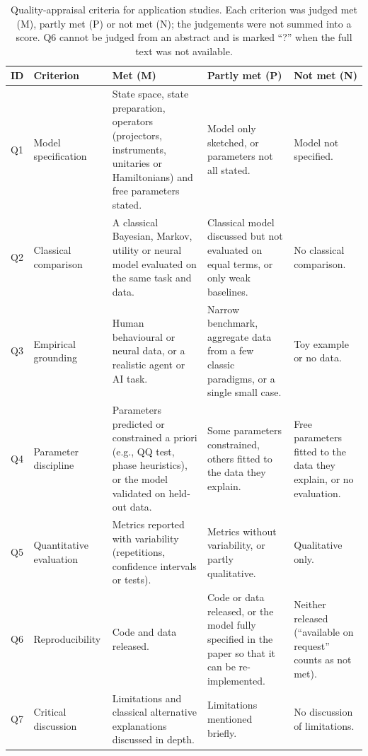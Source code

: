 \documentclass[10pt,a4paper]{article}
\begin{document}
\begin{longtable}{@{}P{0.7cm}P{2.6cm}P{4.6cm}P{4.4cm}P{4.0cm}@{}}
\caption{Quality-appraisal criteria for application studies. Each criterion was judged met (M), partly met (P) or not met (N); the judgements were not summed into a score. Q6 cannot be judged from an abstract and is marked ``?'' when the full text was not available.}\label{tab:S4}\\
\toprule \textbf{ID} & \textbf{Criterion} & \textbf{Met (M)} & \textbf{Partly met (P)} & \textbf{Not met (N)} \\ \midrule \endfirsthead
\bottomrule \endfoot

Q1 & Model specification & State space, state preparation, operators (projectors, instruments, unitaries or Hamiltonians) and free parameters stated. & Model only sketched, or parameters not all stated. & Model not specified. \\
Q2 & Classical comparison & A classical Bayesian, Markov, utility or neural model evaluated on the same task and data. & Classical model discussed but not evaluated on equal terms, or only weak baselines. & No classical comparison. \\
Q3 & Empirical grounding & Human behavioural or neural data, or a realistic agent or AI task. & Narrow benchmark, aggregate data from a few classic paradigms, or a single small case. & Toy example or no data. \\
Q4 & Parameter discipline & Parameters predicted or constrained a priori (e.g., QQ test, phase heuristics), or the model validated on held-out data. & Some parameters constrained, others fitted to the data they explain. & Free parameters fitted to the data they explain, or no evaluation. \\
Q5 & Quantitative evaluation & Metrics reported with variability (repetitions, confidence intervals or tests). & Metrics without variability, or partly qualitative. & Qualitative only. \\
Q6 & Reproducibility & Code and data released. & Code or data released, or the model fully specified in the paper so that it can be re-implemented. & Neither released (``available on request'' counts as not met). \\
Q7 & Critical discussion & Limitations and classical alternative explanations discussed in depth. & Limitations mentioned briefly. & No discussion of limitations. \\
\end{longtable}
\end{document}

